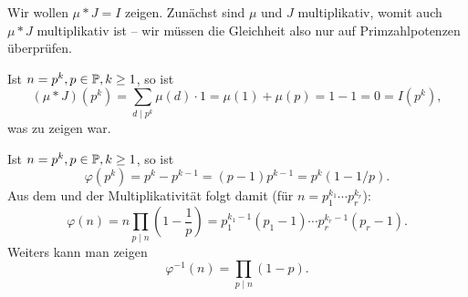 \begin{remark}
    Wir wollen $\mu \ast J = I$ zeigen. Zunächst sind $\mu$ und $J$ multiplikativ, womit auch $\mu \ast J$ multiplikativ ist -- wir müssen die Gleichheit also nur auf Primzahlpotenzen überprüfen.

    Ist $n = p^k, p \in \P, k \geq 1$, so ist
    $$ (\mu \ast J)(p^k) = \sum_{d \mid p^k} \mu(d) \cdot 1 = \mu(1) + \mu(p) = 1 - 1 = 0 = I(p^k), $$
    was zu zeigen war.
\end{remark}

\begin{remark}
    Ist $n = p^k, p \in \P, k \geq 1$, so ist
    $$ \varphi(p^k) = p^k - p^{k-1} = (p-1)p^{k-1} = p^k (1 - 1/p). $$
    Aus dem und der Multiplikativität folgt damit (für $n = p_1^{k_1} \cdots p_r^{k_r}$):
    $$ \varphi(n) = n \prod_{p \mid n} \left( 1 - \frac{1}{p} \right) = p_1^{k_1-1} (p_1 - 1) \cdots p_r^{k_r - 1} (p_r - 1). $$
    Weiters kann man zeigen
    $$ \varphi^{-1}(n) = \prod_{p \mid n} (1 - p). $$
\end{remark}

